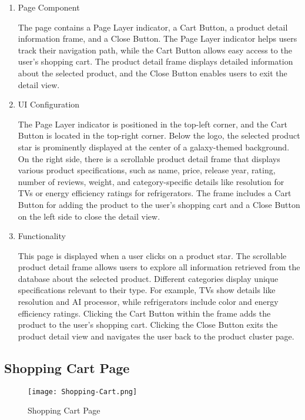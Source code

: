 \documentclass[conference]{IEEEtran}
\begin{document}
\begin{enumerate}
\setlength{\parindent}{2ex}
\setlength{\parskip}{0.5em}
\item Page Component

The page contains a Page Layer indicator, a Cart Button, a product detail information frame, and a Close Button. The Page Layer indicator helps users track their navigation path, while the Cart Button allows easy access to the user's shopping cart. The product detail frame displays detailed information about the selected product, and the Close Button enables users to exit the detail view.

\item UI Configuration

The Page Layer indicator is positioned in the top-left corner, and the Cart Button is located in the top-right corner. Below the logo, the selected product star is prominently displayed at the center of a galaxy-themed background. On the right side, there is a scrollable product detail frame that displays various product specifications, such as name, price, release year, rating, number of reviews, weight, and category-specific details like resolution for TVs or energy efficiency ratings for refrigerators. The frame includes a Cart Button for adding the product to the user's shopping cart and a Close Button on the left side to close the detail view.

\item Functionality

This page is displayed when a user clicks on a product star. The scrollable product detail frame allows users to explore all information retrieved from the database about the selected product. Different categories display unique specifications relevant to their type. For example, TVs show details like resolution and AI processor, while refrigerators include color and energy efficiency ratings. Clicking the Cart Button within the frame adds the product to the user's shopping cart. Clicking the Close Button exits the product detail view and navigates the user back to the product cluster page.

\end{enumerate}


\subsection{Shopping Cart Page}
\begin{figure}[H]
    \centering
    \texttt{[image: Shopping-Cart.png]}
    \caption{Shopping Cart Page}
    \label{fig:Shopping Cart Page}
\end{figure}
\end{document}
